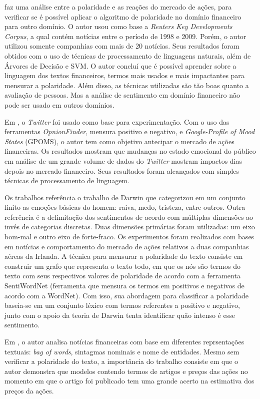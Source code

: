 \documentclass[a4paper,12pt]{article}
\begin{document}
\cite{pablotese} faz uma análise entre a polaridade e as reações do mercado de ações, para verificar se é possível aplicar o algoritmo de polaridade no domínio financeiro para outro domínio. O autor usou como base a \textit{Reuters Key Developments Corpus}, a qual contém notícias entre o período de 1998 e 2009. Porém, o autor utilizou somente companhias com mais de 20 notícias. Seus resultados foram obtidos com o uso de técnicas de processamento de linguagens naturais, além de Árvores de Decisão e SVM. O autor concluí que é possível aprender sobre a linguagem dos textos financeiros, termos mais usados e mais impactantes para mensurar a polaridade. Além disso, as técnicas utilizadas são tão boas quanto a avaliação de pessoas. Mas a análise de sentimento em domínio financeiro não pode ser usado em outros domínios. 

Em \cite{jbhx}, o \textit{Twitter} foi usado como base para experimentação. Com o uso das ferramentas \textit{OpnionFinder}, mensura positivo e negativo, e \textit{Google-Profile of Mood States} (GPOMS), o autor tem como objetivo antecipar o mercado de ações financeiras. Os resultados mostram que mudanças no estado emocional do público em análise de um grande volume de dados do \textit{Twitter} mostram impactos dias depois no mercado financeiro. Seus resultados foram alcançados com simples técnicas de processamento de linguagem.

Os trabalhos \cite{lexiconAA,cohesion} referência o trabalho de Darwin que categorizou em um conjunto finito as emoções básicas do homem: raiva, medo, tristeza, entre outros. Outra referência é a delimitação dos sentimentos de acordo com múltiplas dimensões ao invés de categorias discretas. Duas dimensões primárias foram utilizadas: um eixo bom-mal e outro eixo de forte-fraco. Os experimentos foram realizados com bases em notícias e comportamento do mercado de ações relativos a duas companhias aéreas da Irlanda. A técnica para mensurar a polaridade do texto consiste em construir um grafo que representa o texto todo, em que os nós são termos do texto com seus respectivos valores de polaridade de acordo com a ferramenta SentiWordNet (ferramenta que mensura os termos em positivos e negativos de acordo com a WordNet). Com isso, sua abordagem para classificar a polaridade baseia-se em um conjunto léxico com termos referentes a positivo e negativo, junto com o apoio da teoria de Darwin tenta identificar quão intenso é esse sentimento.

Em \cite{azsystem}, o autor analisa notícias financeiras com base em diferentes reprsentações textuais: \textit{bag of words}, sintagmas nominais e nome de entidades. Mesmo sem verificar a polaridade do texto, a importância do trabalho consiste em que o autor demonstra que modelos contendo termos de artigos e preços das ações no momento em que o artigo foi publicado tem uma grande acerto na estimativa dos preços da ações.
\end{document}
